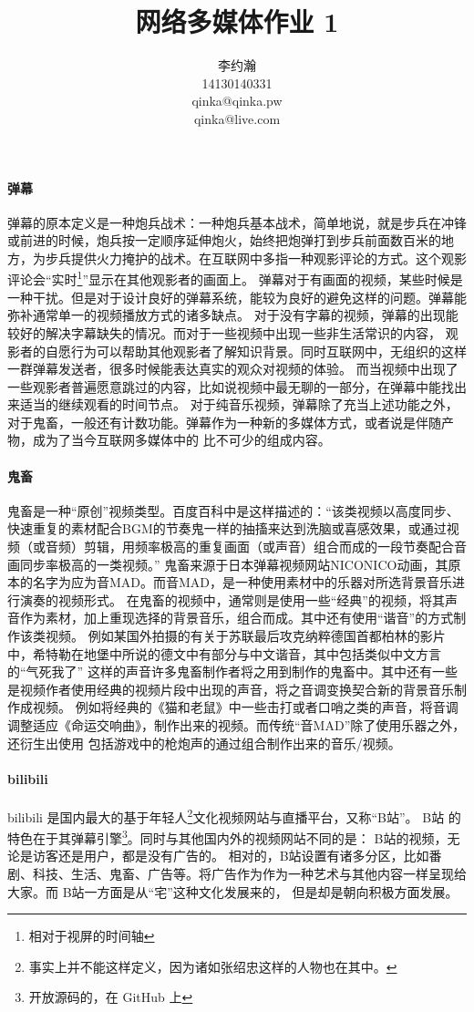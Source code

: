 \documentclass{ctexart}
\title{网络多媒体作业 1}
\author{李约瀚 \\ 14130140331 \\ qinka@qinka.pw \\ qinka@live.com}
\begin{document}
    \maketitle
    \paragraph{弹幕}
    弹幕的原本定义是一种炮兵战术：一种炮兵基本战术，简单地说，就是步兵在冲锋或前进的时候，炮兵按一定顺序延伸炮火，始终把炮弹打到步兵前面数百米的地方，为步兵提供火力掩护的战术。在互联网中多指一种观影评论的方式。这个观影评论会“实时\footnote{相对于视屏的时间轴}”显示在其他观影者的画面上。
    弹幕对于有画面的视频，某些时候是一种干扰。但是对于设计良好的弹幕系统，能较为良好的避免这样的问题。弹幕能弥补通常单一的视频播放方式的诸多缺点。
    对于没有字幕的视频，弹幕的出现能较好的解决字幕缺失的情况。而对于一些视频中出现一些非生活常识的内容，
    观影者的自愿行为可以帮助其他观影者了解知识背景。同时互联网中，无组织的这样一群弹幕发送者，很多时候能表达真实的观众对视频的体验。
    而当视频中出现了一些观影者普遍愿意跳过的内容，比如说视频中最无聊的一部分，在弹幕中能找出来适当的继续观看的时间节点。
    对于纯音乐视频，弹幕除了充当上述功能之外，对于鬼畜，一般还有计数功能。弹幕作为一种新的多媒体方式，或者说是伴随产物，成为了当今互联网多媒体中的
    比不可少的组成内容。
    \paragraph{鬼畜}
    鬼畜是一种“原创”视频类型。百度百科中是这样描述的：“该类视频以高度同步、快速重复的素材配合BGM的节奏鬼一样的抽搐来达到洗脑或喜感效果，或通过视频（或音频）剪辑，用频率极高的重复画面（或声音）组合而成的一段节奏配合音画同步率极高的一类视频。”
    鬼畜来源于日本弹幕视频网站NICONICO动画，其原本的名字为应为音MAD。而音MAD，是一种使用素材中的乐器对所选背景音乐进行演奏的视频形式。
    在鬼畜的视频中，通常则是使用一些“经典”的视频，将其声音作为素材，加上重现选择的背景音乐，组合而成。其中还有使用“谐音”的方式制作该类视频。
    例如某国外拍摄的有关于苏联最后攻克纳粹德国首都柏林的影片中，希特勒在地堡中所说的德文中有部分与中文谐音，其中包括类似中文方言的“气死我了”
    这样的声音许多鬼畜制作者将之用到制作的鬼畜中。其中还有一些是视频作者使用经典的视频片段中出现的声音，将之音调变换契合新的背景音乐制作成视频。
    例如将经典的《猫和老鼠》中一些击打或者口哨之类的声音，将音调调整适应《命运交响曲》，制作出来的视频。而传统“音MAD”除了使用乐器之外，还衍生出使用
    包括游戏中的枪炮声的通过组合制作出来的音乐/视频。
    \paragraph{bilibili}
    bilibili 是国内最大的基于年轻人\footnote{事实上并不能这样定义，因为诸如张绍忠这样的人物也在其中。}文化视频网站与直播平台，又称“B站”。
    B站 的特色在于其弹幕引擎\footnote{开放源码的，在 GitHub 上}。同时与其他国内外的视频网站不同的是： B站的视频，无论是访客还是用户，都是没有广告的。
    相对的，B站设置有诸多分区，比如番剧、科技、生活、鬼畜、广告等。将广告作为作为一种艺术与其他内容一样呈现给大家。而 B站一方面是从“宅”这种文化发展来的，
    但是却是朝向积极方面发展。
    
\end{document}

